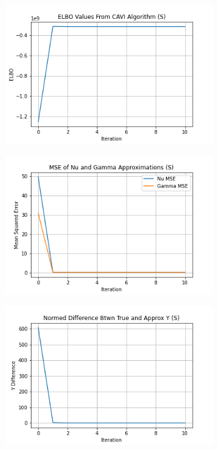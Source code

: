 \documentclass[letterpaper,12pt]{article}
\begin{document}
\begin{figure}[h]
\centering
    \begin{subfigure}{0.32\textwidth}
        \includegraphics[width=\linewidth]{plots/ELBO_Values_From_CAVI_Algorithm_(S).png}
    \end{subfigure}
    \begin{subfigure}{0.32\textwidth}
        \includegraphics[width=\linewidth]{plots/MSE_of_Nu_and_Gamma_Approximations_(S).png}
    \end{subfigure}
    \begin{subfigure}{0.32\textwidth}
        \includegraphics[width=\linewidth]{plots/Normed_Difference_Btwn_True_and_Approx_Y_(S).png}

\end{subfigure}
\end{figure}
\end{document}
